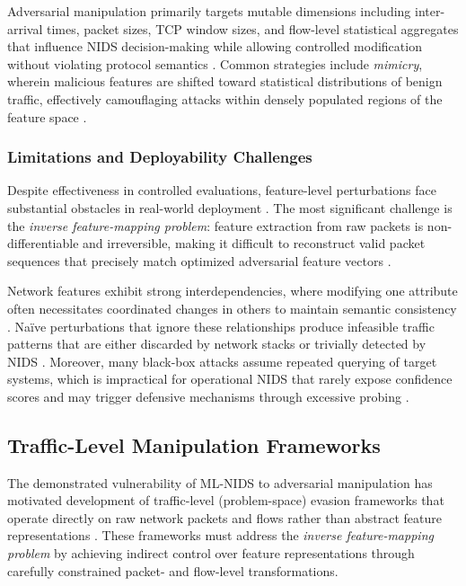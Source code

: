 Adversarial manipulation primarily targets mutable dimensions including inter-arrival times, packet sizes, TCP window sizes, and flow-level statistical aggregates that influence NIDS decision-making while allowing controlled modification without violating protocol semantics \cite{han2021evaluating}. Common strategies include \emph{mimicry}, wherein malicious features are shifted toward statistical distributions of benign traffic, effectively camouflaging attacks within densely populated regions of the feature space \cite{li2020adversarial}.

\subsubsection{Limitations and Deployability Challenges}

Despite effectiveness in controlled evaluations, feature-level perturbations face substantial obstacles in real-world deployment \cite{debicha2023adv}. The most significant challenge is the \emph{inverse feature-mapping problem}: feature extraction from raw packets is non-differentiable and irreversible, making it difficult to reconstruct valid packet sequences that precisely match optimized adversarial feature vectors \cite{han2021evaluating}.

Network features exhibit strong interdependencies, where modifying one attribute often necessitates coordinated changes in others to maintain semantic consistency \cite{ennaji2025adversarial}. Naïve perturbations that ignore these relationships produce infeasible traffic patterns that are either discarded by network stacks or trivially detected by NIDS \cite{vitorino2023sok}. Moreover, many black-box attacks assume repeated querying of target systems, which is impractical for operational NIDS that rarely expose confidence scores and may trigger defensive mechanisms through excessive probing \cite{liu2025hard}.

\subsection{Traffic-Level Manipulation Frameworks}

The demonstrated vulnerability of ML-NIDS to adversarial manipulation has motivated development of traffic-level (problem-space) evasion frameworks that operate directly on raw network packets and flows rather than abstract feature representations \cite{vitorino2023sok}. These frameworks must address the \emph{inverse feature-mapping problem} by achieving indirect control over feature representations through carefully constrained packet- and flow-level transformations.

